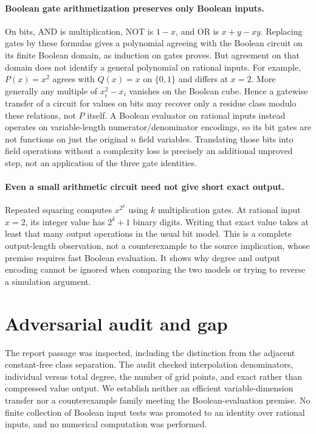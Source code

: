 \documentclass[11pt]{article}
\begin{document}
\paragraph{Boolean gate arithmetization preserves only Boolean inputs.}
On bits, AND is multiplication, NOT is $1-x$, and OR is $x+y-xy$.
Replacing gates by these formulas gives a polynomial agreeing with the
Boolean circuit on its finite Boolean domain, as induction on gates proves.
But agreement on that domain does not identify a general polynomial on
rational inputs. For example, $P(x)=x^2$ agrees with $Q(x)=x$ on $\{0,1\}$
and differs at $x=2$. More generally any multiple of $x_i^2-x_i$ vanishes
on the Boolean cube. Hence a gatewise transfer of a circuit for values on
bits may recover only a residue class modulo these relations, not $P$ itself.
A Boolean evaluator on rational inputs instead operates on variable-length
numerator/denominator encodings, so its bit gates are not functions on just
the original $n$ field variables. Translating those bits into field operations
without a complexity loss is precisely an additional unproved step, not an
application of the three gate identities.

\paragraph{Even a small arithmetic circuit need not give short exact output.}
Repeated squaring computes $x^{2^k}$ using $k$ multiplication gates.
At rational input $x=2$, its integer value has $2^k+1$ binary digits.
Writing that exact value takes at least that many output operations in the
usual bit model. This is a complete output-length observation, not a
counterexample to the source implication, whose premise requires fast Boolean
evaluation. It shows why degree and output encoding cannot be ignored when
comparing the two models or trying to reverse a simulation argument.

\section{Adversarial audit and gap}
The report passage was inspected, including the distinction from the adjacent
constant-free class separation. The audit checked interpolation denominators,
individual versus total degree, the number of grid points, and exact rather
than compressed value output. We establish neither an efficient variable-dimension
transfer nor a counterexample family meeting the Boolean-evaluation premise.
No finite collection of Boolean input tests was promoted to an identity over
rational inputs, and no numerical computation was performed.
\end{document}
